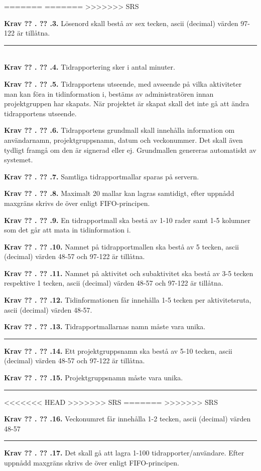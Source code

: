 \documentclass[a4paper]{article}
\newcommand\getcurrentref[1]{%
 \ifnumequal{\value{#1}}{0}
  {??}
  {\the\value{#1}}%
}
\newcommand\requirement[2]{
	\numberedrow{Krav}{#1}{#2}
}
\newcommand\numberedrow[3]{
	\noindent
	\textbf{#1 \getcurrentref{section}.\getcurrentref{subsection}.#2.} #3
	
}
\begin{document}
=======
=======
>>>>>>> SRS
\requirement{3}{Lösenord skall bestå av sex tecken, ascii (decimal) värden 97-122 är tillåtna.}
\noindent\rule{8cm}{0.4pt} \\ %
\requirement{4}{Tidrapportering sker i antal minuter.}
\requirement{5}{Tidrapportens utseende, med avseende på vilka aktiviteter man kan föra in tidinformation i, bestäms av administratören innan projektgruppen har skapats. När projektet är skapat skall det inte gå att ändra tidrapportens utseende.}
\requirement{6}{Tidrapportens grundmall skall innehålla information om användarnamn, projektgruppsnamn, datum och veckonummer. Det skall även tydligt framgå om den är signerad eller ej. Grundmallen genereras automatiskt av systemet.}
\requirement{7}{Samtliga tidrapportmallar sparas på servern.}
\requirement{8}{Maximalt 20 mallar kan lagras samtidigt, efter uppnådd maxgräns skrivs de över enligt FIFO-principen.}
\requirement{9}{En tidrapportmall ska bestå av 1-10 rader samt 1-5 kolumner som det går att mata in tidinformation i.}
\requirement{10}{Namnet på tidrapportmallen ska bestå av 5 tecken, ascii (decimal) värden 48-57 och 97-122 är tillåtna.}
\requirement{11}{Namnet på aktivitet och subaktivitet ska bestå av 3-5 tecken respektive 1 tecken, ascii (decimal) värden 48-57 och 97-122 är tillåtna.}
\requirement{12}{Tidinformationen får innehålla 1-5 tecken per aktivitetsruta, ascii (decimal) värden 48-57.}
\requirement{13}{Tidrapportmallarnas namn måste vara unika.}

\noindent\rule{8cm}{0.4pt}  %

\requirement{14}{Ett projektgruppsnamn ska bestå av 5-10 tecken, ascii (decimal) värden 48-57 och 97-122 är tillåtna.}
\requirement{15}{Projektgruppsnamn måste vara unika.}

\noindent\rule{8cm}{0.4pt}  %
<<<<<<< HEAD
>>>>>>> SRS
=======
>>>>>>> SRS

\requirement{16}{Veckonumret får innehålla 1-2 tecken, ascii (decimal) värden 48-57}

\noindent\rule{8cm}{0.4pt}  %

\requirement{17}{Det skall gå att lagra 1-100 tidrapporter/användare. Efter uppnådd maxgräns skrivs de över enligt FIFO-principen.}
\end{document}
